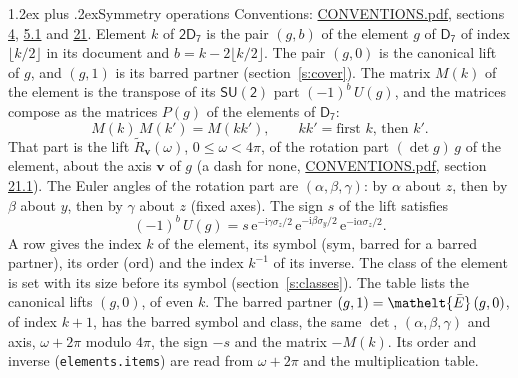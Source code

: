 \documentclass[10pt,a4paper]{article}
\makeatletter
\renewcommand\section{\@startsection{section}{1}{\z@}{-3ex plus -1ex minus -.2ex}%
  {1.2ex plus .2ex}{\normalfont\large\sffamily\bfseries\color{parttitle}}}
\numberwithin{equation}{section}
\newcommand{\eltfont}[1]{{\let\sigma\eltsigma\mathelt{#1}}}
\newcommand{\grp}[1]{\mathsf{#1}}
\newcommand{\elt}[1]{\eltfont{#1}}
\newcommand{\vv}{\mathbf{v}}
\newcommand{\iunit}{\mathrm{i}}
\newcommand{\expe}{\mathrm{e}}
\newcommand{\barred}[1]{\bar{#1}}
\newcommand{\lift}[1]{\tilde{#1}}
\newcommand{\pauli}[1]{\sigma_{#1}}
\makeatother
\begin{document}
\section{Symmetry operations}\label{s:elements}
Conventions: \href{../../CONVENTIONS.pdf}{CONVENTIONS.pdf}, sections \href{../../../rotation/CONVENTIONS.pdf\#conv.4}{4}, \href{../../../rotation/CONVENTIONS.pdf\#conv.5.1}{5.1} and \href{../../CONVENTIONS.pdf\#conv.21}{21}.
\leavevmode\label{n:index.element}\label{n:element.g}Element $k$ of $\grp{2D_{7}}$ is the pair $(g, b)$ of the element $g$ of \href{../../../rotation/data/pdf/D7.pdf}{$\grp{D_{7}}$} of index $\lfloor k/2\rfloor$ in its document and $b = k - 2\lfloor k/2\rfloor$. The pair $(g, 0)$ is the canonical lift of $g$, and $(g, 1)$ is its barred partner (section~\ref{s:cover}). \label{n:matrix.element.pin}\label{n:matrix.element}The matrix $M(k)$ of the element is the transpose of its $\grp{SU(2)}$ part $(-1)^{b}\,U(g)$, and the matrices compose as the matrices $P(g)$ of the elements of $\grp{D_{7}}$:
\begin{equation}\label{e:mprod}M(k)\,M(k') = M(kk'),\qquad kk' = \text{first } k\text{, then } k'.\end{equation}
\leavevmode\label{n:angle.omega}\label{n:vector.axis}\label{n:vector.pole}That part is the lift $\lift{R}_{\vv}(\omega)$, $0 \le \omega < 4\pi$, of the rotation part $(\det g)\,g$ of the element, about the axis $\vv$ of $g$ (a dash for none, \href{../../CONVENTIONS.pdf}{CONVENTIONS.pdf}, section \href{../../CONVENTIONS.pdf\#conv.21.1}{21.1}). \label{n:angle.euler.alpha}\label{n:angle.euler.beta}\label{n:angle.euler.gamma}\label{n:vector.coordinates}The Euler angles of the rotation part are $(\alpha,\beta,\gamma)$: by $\alpha$ about $z$, then by $\beta$ about $y$, then by $\gamma$ about $z$ (fixed axes). \label{n:local.euler.sign}The sign $s$ of the lift satisfies
\begin{equation}\label{e:euler}(-1)^{b}\,U(g) = s\,\expe^{-\iunit\gamma\pauli{z}/2}\,\expe^{-\iunit\beta\pauli{y}/2}\,\expe^{-\iunit\alpha\pauli{z}/2}.\end{equation}
\leavevmode\label{n:index.element.inverse}\label{n:head.sym}\label{n:head.ord}A row gives the index $k$ of the element, its symbol (sym, barred for a barred partner), its order (ord) and the index $k^{-1}$ of its inverse. \label{n:head.class}The class of the element is set with its size before its symbol (section~\ref{s:classes}).
The table lists the canonical lifts $(g, 0)$, of even $k$. The barred partner $(g, 1) = \elt{\barred{E}}\,(g, 0)$, of index $k + 1$, has the barred symbol and class, the same $\det$, $(\alpha,\beta,\gamma)$ and axis, $\omega + 2\pi$ modulo $4\pi$, the sign $-s$ and the matrix $-M(k)$. Its order and inverse (\texttt{elements.items}) are read from $\omega + 2\pi$ and the multiplication table.
\end{document}
